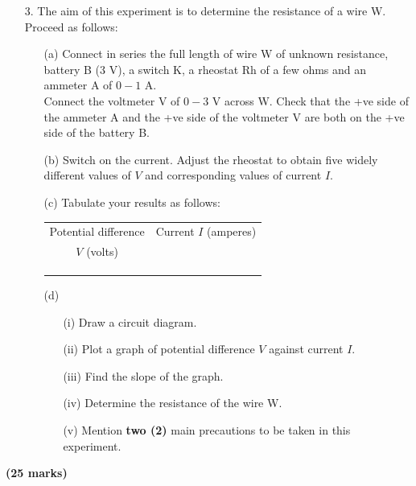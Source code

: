 \begin{enumerate}
\item[3.] The aim of this experiment is to determine the resistance of a wire W.\\
Proceed as follows:
\begin{enumerate}
\item[(a)] Connect in series the full length of wire W of unknown resistance, battery B (3 V), a switch K, a rheostat Rh of a few ohms and an ammeter A of $0 - 1$ A.\\
Connect the voltmeter V of $0 - 3$ V across W. Check that the +ve side of the ammeter A and the +ve side of the voltmeter V are both on the +ve side of the battery B.
\item[(b)] Switch on the current. Adjust the rheostat to obtain five widely different values of $V$ and corresponding values of current $I$.
\item[(c)] Tabulate your results as follows:\\[10pt]
\begin{tabular}{|p{4cm}|p{4cm}|} \hline
\multicolumn{1}{|c|}{Potential difference} & \multicolumn{1}{c|}{Current $I$ (amperes)} \\
\multicolumn{1}{|c|}{$V$ (volts)} & \\ \hline
& \\ 
& \\ 
& \\ \hline
\end{tabular}
\item[(d)]
\begin{enumerate}
\item[(i)] Draw a circuit diagram.
\item[(ii)] Plot a graph of potential difference $V$ against current $I$.
\item[(iii)] Find the slope of the graph.
\item[(iv)] Determine the resistance of the wire W.
\item[(v)] Mention \textbf{two (2)} main precautions to be taken in this experiment.
\end{enumerate}
\end{enumerate}
\end{enumerate}
\flushright \textbf{(25 marks)}
\flushleft